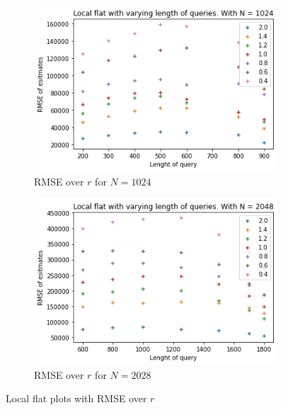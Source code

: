 \documentclass[11pt]{article}
\theoremstyle{definition}
\begin{document}
\begin{figure}[H]
\centering
\begin{subfigure}{.4\textwidth}
  \centering
  \includegraphics[width=\linewidth]{figures/local_flat/varying_r/loc_flat_varying_length_N=1024.png}
  \caption{RMSE over $r$ for $N=1024$}
  \label{fig:loc_r_sub1_1}
\end{subfigure}%
\begin{subfigure}{.4\textwidth}
  \centering
  \includegraphics[width=\linewidth]{figures/local_flat/varying_r/loc_flat_varying_length_N=2048.png}
  \caption{RMSE over $r$ for $N=2028$}
  \label{fig:loc_r_sub3_2}
\end{subfigure}
\caption{Local flat plots with RMSE over $r$}
\label{fig:plt_loc_r}
\end{figure}
\end{document}
